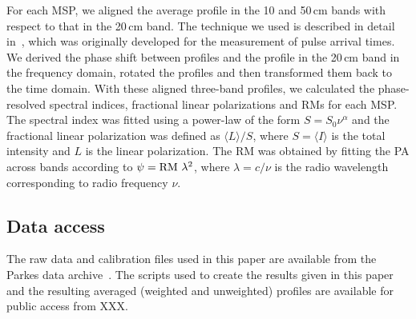 \documentclass[useAMS,usenatbib]{mn2e}
\begin{document}

For each MSP, we aligned the average profile in the 10 and 50\,cm bands with 
respect to that in the 20\,cm band.
%
The technique we used is described in detail in~\citet{Taylor92}, which 
was originally developed for the measurement of pulse arrival times.
%
We derived the phase shift between profiles and the profile in the 20\,cm band 
in the frequency domain, rotated the profiles and then transformed them back to 
the time domain.
%
With these aligned three-band profiles, we calculated the phase-resolved 
spectral indices, fractional linear polarizations and RMs for each MSP. 
The spectral index was fitted using a power-law of the form $S=S_{0}\nu^{\alpha}$ 
and the fractional linear polarization was defined as $\langle L \rangle/S$, 
where $S=\langle I\rangle$ is the total intensity and $L$ is the linear polarization.
%
The RM was obtained by fitting the PA across bands according to $\psi=\rm{RM}\ \lambda^{2}$,
where $\lambda=c/\nu$ is the radio wavelength corresponding to radio 
frequency $\nu$.
%



%
%

\subsection{Data access}

The raw data and calibration files used in this paper are available from the 
Parkes data archive~\citep[][data.csiro.au]{Hobbs11}.  
%
The scripts used to create the results given in this paper and the resulting averaged 
(weighted and unweighted) profiles are available for public access from XXX.
\end{document}
